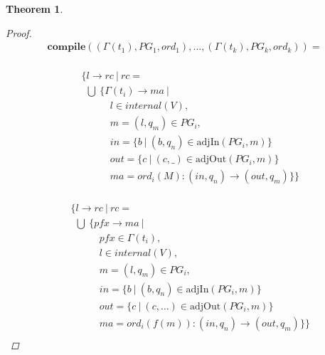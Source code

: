 \documentclass[twocolumn]{sig-alternate-10pt}
\newtheorem{thm}{Theorem}[section]
\begin{document}
\begin{thm}
\begin{proof}

  \[ \begin{array}{l}
     \textbf{compile}( (\Gamma(t_1),PG_1,ord_1), \dots, (\Gamma(t_k),PG_k,ord_k) ) = \\
  \end{array} \]%

  \[ \begin{array}{l}
     ~~~~~ \{ l \rightarrow rc ~\vert~ rc = \\
     ~~~~~~~ \bigcup~ \{ \Gamma(t_i) \rightarrow ma ~\vert~ \\
     ~~~~~~~~~~~~~~~~~~ l \in internal(V), \\
     ~~~~~~~~~~~~~~~~~~ m = (l,q_m) \in PG_i, \\
     ~~~~~~~~~~~~~~~~~~ in = \{ b ~\vert~ (b,q_n) \in \text{adjIn}(PG_i,m) \} \\
     ~~~~~~~~~~~~~~~~~~ out = \{ c ~\vert~ (c,\_) \in \text{adjOut}(PG_i,m) \} \\
     ~~~~~~~~~~~~~~~~~~ ma = ord_i(M) : (in,q_n) \rightarrow (out,q_m) \} \} \\
  \end{array} \]%

  \[ \begin{array}{l}
     ~~~~~ \{ l \rightarrow rc ~\vert~ rc = \\
     ~~~~~~~ \bigcup~ \{ pfx \rightarrow ma ~\vert~ \\
     ~~~~~~~~~~~~~~~~~~ pfx \in \Gamma(t_i), \\
     ~~~~~~~~~~~~~~~~~~ l \in internal(V), \\
     ~~~~~~~~~~~~~~~~~~ m = (l,q_m) \in PG_i, \\
     ~~~~~~~~~~~~~~~~~~ in = \{ b ~\vert~ (b,q_n) \in \text{adjIn}(PG_i,m) \} \\
     ~~~~~~~~~~~~~~~~~~ out = \{ c ~\vert~ (c,\dots) \in \text{adjOut}(PG_i,m) \} \\ 
     ~~~~~~~~~~~~~~~~~~ ma = ord_i(f(m)) : (in,q_n) \rightarrow (out,q_m) \} \} \\
  \end{array} \]%


\end{proof}
\end{thm}
\end{document}
